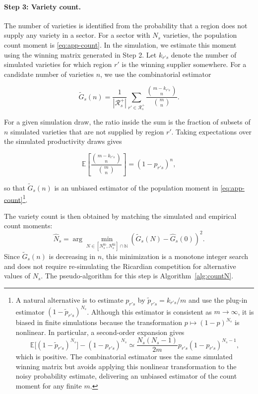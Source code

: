 \paragraph{Step 3: Variety count.}
The number of varieties is identified from the probability that a region does not supply any variety in a sector. For a sector with $N_s$ varieties, the population count moment is \eqref{eq:app-count}. In the simulation, we estimate this moment using the winning matrix generated in Step 2. Let $k_{r's}$ denote the number of simulated varieties for which region $r'$ is the winning supplier somewhere. For a candidate number of varieties $n$, we use the combinatorial estimator

\begin{equation}
\tilde G_s(n) = \frac{1}{|\mathcal R_s^+|} \sum_{r'\in\mathcal R_s^+} \frac{\binom{m-k_{r's}}{n}} {\binom{m}{n}} . \label{eq:app-Gclosed}
\end{equation}

For a given simulation draw, the ratio inside the sum is the fraction of subsets of $n$ simulated varieties that are not supplied by region $r'$. Taking expectations over the simulated productivity draws gives

$$ \mathbb{E} \left[ \frac{\binom{m-k_{r's}}{n}} {\binom{m}{n}} \right] = (1-p_{r's})^{n}, $$

so that $\tilde G_s(n)$ is an unbiased estimator of the population moment in \eqref{eq:app-count}\footnote{A natural alternative is to estimate $p_{r's}$ by $\tilde p_{r's}=k_{r's}/m$ and use the plug-in estimator $(1-\tilde p_{r's})^{N_s}$. Although this estimator is consistent as $m\rightarrow\infty$, it is biased in finite simulations because the transformation $p\mapsto(1-p)^{N_s}$ is nonlinear. In particular, a second-order expansion gives $$ \mathbb{E}\big[(1-\tilde p_{r's})^{N_s}\big] -(1-p_{r's})^{N_s} \simeq \frac{N_s(N_s-1)}{2m} p_{r's}(1-p_{r's})^{N_s-1}, $$ which is positive. The combinatorial estimator uses the same simulated winning matrix but avoids applying this nonlinear transformation to the noisy probability estimate, delivering an unbiased estimator of the count moment for any finite $m$.}.

The variety count is then obtained by matching the simulated and empirical count moments:
\begin{equation}
\hat N_s = \arg\min_{N\in[N_s^{\mathrm{lo}},N_s^{\mathrm{hi}}]\cap\mathbb N} \left(\tilde G_s(N)-\hat G_s(0)\right)^2 . \label{eq:app-profile}
\end{equation}
Since $\tilde G_s(n)$ is decreasing in $n$, this minimization is a monotone integer search and does not require re-simulating the Ricardian competition for alternative values of $N_s$. The pseudo-algorithm for this step is Algorithm~\ref{alg:countN}.

